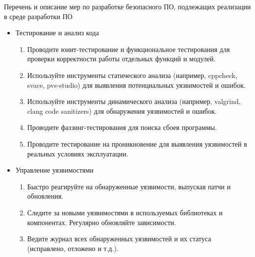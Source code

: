 \documentclass[10pt]{beamer}
\begin{document}
\begin{frame}{Перечень и описание мер по разработке безопасного ПО, подлежащих реализации в среде разработки ПО}
    \begin{itemize}
    \item Тестирование и анализ кода
    \begin{enumerate}
        \item Проводите юнит-тестирование и функциональное тестирования для проверки корректности работы отдельных функций и модулей.
        \item Используйте инструменты статического анализа (например, cppcheck, svace, pvs-studio) для выявления потенциальных уязвимостей и ошибок.
        \item Используйте инструменты динамического анализа (например, valgrind, clang code sanitizers) для обнаружения уязвимостей и ошибок.
        \item Проводите фаззинг-тестирования для поиска сбоев программы.
        \item Проводите тестирование на проникновение для выявления уязвимостей в реальных условиях эксплуатации.
    \end{enumerate}

    \item Управление уязвимостями
    \begin{enumerate}
        \item Быстро реагируйте на обнаруженные уязвимости, выпуская патчи и обновления.
        \item Следите за новыми уязвимостями в используемых библиотеках и компонентах. Регулярно обновляйте зависимости.
        \item Ведите журнал всех обнаруженных уязвимостей и их статуса (исправлено, отложено и т.д.).
    \end{enumerate}
\end{itemize}
\end{frame}
\end{document}
